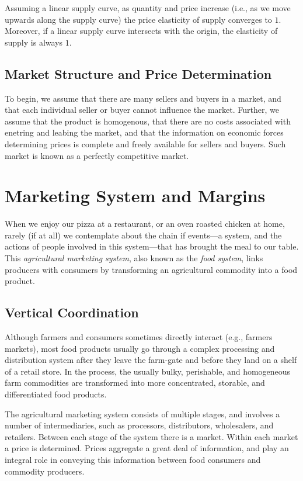 \documentclass[]{book}
\begin{document}
Assuming a linear supply curve, as quantity and price increase (i.e., as
we move upwards along the supply curve) the price elasticity of supply
converges to \(1\). Moreover, if a linear supply curve intersects with
the origin, the elasticity of supply is always \(1\).

\section{Market Structure and Price
Determination}\label{market-structure-and-price-determination}

To begin, we assume that there are many sellers and buyers in a market,
and that each individual seller or buyer cannot influence the market.
Further, we assume that the product is homogenous, that there are no
costs associated with enetring and leabing the market, and that the
information on economic forces determining prices is complete and freely
available for sellers and buyers. Such market is known as a perfectly
competitive market.

\chapter{Marketing System and
Margins}\label{marketing-system-and-margins}

When we enjoy our pizza at a restaurant, or an oven roasted chicken at
home, rarely (if at all) we contemplate about the chain if events---a
system, and the actions of people involved in this system---that has
brought the meal to our table. This \emph{agricultural marketing
system}, also known as the \emph{food system}, links producers with
consumers by transforming an agricultural commodity into a food product.

\section{Vertical Coordination}\label{vertical-coordination}

Although farmers and consumers sometimes directly interact (e.g.,
farmers markets), most food products usually go through a complex
processing and distribution system after they leave the farm-gate and
before they land on a shelf of a retail store. In the process, the
usually bulky, perishable, and homogeneous farm commodities are
transformed into more concentrated, storable, and differentiated food
products.

The agricultural marketing system consists of multiple stages, and
involves a number of intermediaries, such as processors, distributors,
wholesalers, and retailers. Between each stage of the system there is a
market. Within each market a price is determined. Prices aggregate a
great deal of information, and play an integral role in conveying this
information between food consumers and commodity producers.
\end{document}
